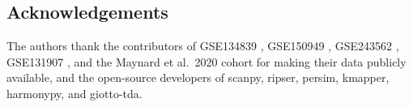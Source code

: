 \subsection*{Acknowledgements}
The authors thank the contributors of GSE134839 \citep{aissa2021},
GSE150949 \citep{oren2021}, GSE243562 \citep{wurtz2024}, GSE131907
\citep{kim2020}, and the Maynard et al.~2020 cohort \citep{maynard2020}
for making their data publicly available, and the open-source developers
of scanpy, ripser, persim, kmapper, harmonypy, and giotto-tda.
